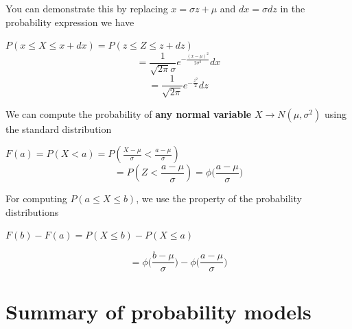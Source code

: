 \documentclass[
]{book}
\begin{document}
You can demonstrate this by replacing \(x=\sigma z+\mu\) and \(dx=\sigma dz\) in the probability expression we have

\(P(x\leq X \leq x +dx)=P(z\leq Z \leq z +dz)\)
\[=\frac{1}{\sqrt{2\pi}\sigma}e^{-\frac{(x-\mu)^2}{2\sigma^2}}dx\] \[=\frac{1}{ \sqrt{2\pi}}e^{-\frac{z^2}{2}} dz\]

We can compute the probability of \textbf{any normal variable} \(X\rightarrow N(\mu, \sigma^2)\) using the standard distribution

\(F(a)=P(X<a)=P(\frac{X-\mu}{\sigma}<\frac{a-\mu}{\sigma})\)
\[=P(Z < \frac{a-\mu}{\sigma})= \phi \big(\frac{a-\mu}{\sigma}\big)\]

For computing \(P(a\leq X \leq b)\), we use the property of the probability distributions

\(F(b)-F(a)=P(X\leq b)-P(X\leq a)\)

\[=\phi \big(\frac{b-\mu}{\sigma}\big)-\phi \big(\frac{a-\mu}{\sigma}\big)\]

\hypertarget{summary-of-probability-models}{%
\section{Summary of probability models}\label{summary-of-probability-models}}
\end{document}
